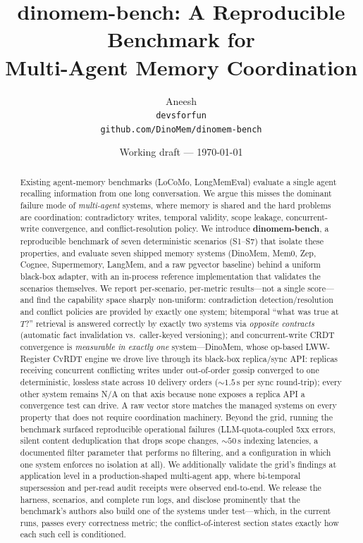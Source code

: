 \documentclass[11pt]{article}
\title{\textbf{dinomem-bench: A Reproducible Benchmark for\\ Multi-Agent Memory Coordination}}
\author{Aneesh \\ \texttt{devsforfun} \\ \texttt{github.com/DinoMem/dinomem-bench}}
\date{Working draft --- \today}
\begin{document}
\maketitle

\begin{abstract}
Existing agent-memory benchmarks (LoCoMo, LongMemEval) evaluate a single agent
recalling information from one long conversation. We argue this misses the dominant
failure mode of \emph{multi-agent} systems, where memory is shared and the hard
problems are coordination: contradictory writes, temporal validity, scope leakage,
concurrent-write convergence, and conflict-resolution policy. We introduce
\textbf{dinomem-bench}, a reproducible benchmark of seven deterministic scenarios
(S1--S7) that isolate these properties, and evaluate seven shipped memory systems
(DinoMem, Mem0, Zep, Cognee, Supermemory, LangMem, and a raw pgvector baseline)
behind a uniform black-box adapter, with an in-process reference implementation that
validates the scenarios themselves. We report per-scenario, per-metric results---not
a single score---and find the capability space sharply non-uniform: contradiction
detection/resolution and conflict policies are provided by exactly one system;
bitemporal ``what was true at $T$?'' retrieval is answered correctly by exactly two
systems via \emph{opposite contracts} (automatic fact invalidation vs.\ caller-keyed
versioning); and concurrent-write CRDT convergence is \emph{measurable in exactly
one} system---DinoMem, whose op-based LWW-Register CvRDT engine we drove live
through its black-box replica/sync API: replicas receiving concurrent conflicting
writes under out-of-order gossip converged to one deterministic, lossless state
across 10 delivery orders (${\sim}1.5$\,s per sync round-trip); every other system
remains N/A on that axis because none exposes a replica API a convergence test can
drive. A raw vector store matches the managed systems on every property that does
not require coordination machinery. Beyond the grid, running the benchmark surfaced
reproducible operational failures (LLM-quota-coupled 5xx errors, silent content
deduplication that drops scope changes, ${\sim}50$\,s indexing latencies, a
documented filter parameter that performs no filtering, and a configuration in
which one system enforces no isolation at all). We additionally validate the
grid's findings at application level in a production-shaped multi-agent app, where
bi-temporal supersession and per-read audit receipts were observed end-to-end.
We release the harness, scenarios, and complete run logs, and disclose prominently
that the benchmark's authors also build one of the systems under test---which, in
the current runs, passes every correctness metric; the conflict-of-interest section
states exactly how each such cell is conditioned.
\end{abstract}
\end{document}
